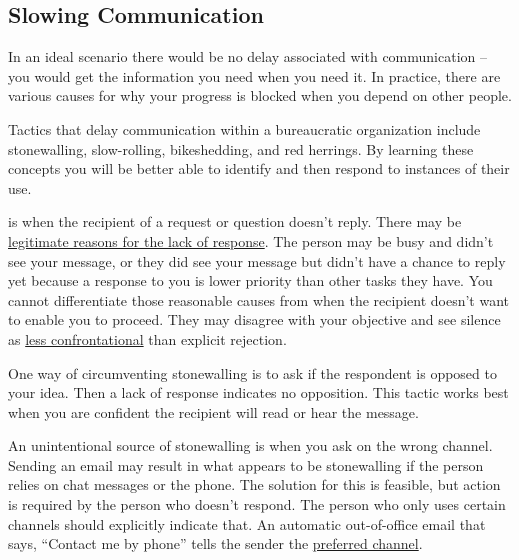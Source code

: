 \subsection*{Slowing Communication\label{sec:slowing-communication}}

In an ideal scenario there would be no delay associated with communication -- you would get the information you need when you need it. In practice, there are various causes for why your progress is blocked when you depend on other people. 

Tactics that delay communication within a bureaucratic organization include stonewalling, slow-rolling, bikeshedding, and red herrings. By learning these concepts you will be better able to identify and then respond to instances of their use.

\iftoggle{glossaryinmargin}{\marginpar{[Glossary]}}{}
\iftoggle{glossarysubstitutionworks}{\Gls{stonewalling}}{Stonewalling} 
is when the recipient of a request or question  doesn't reply. There may be \hyperref[sec:email-responsiveness]{legitimate reasons for the lack of response}.
\iftoggle{haspagenumbers}{\marginpar{Page~\pageref{sec:email-responsiveness}.}}{}%
The person may be busy and didn't see your message, or they did see your message but didn't have a chance to reply yet because a response to you is lower priority than other tasks they have. You cannot differentiate those reasonable causes from when the recipient doesn't want to enable you to proceed. They may disagree with your objective and see silence as \href{https://en.wikipedia.org/wiki/Passive-aggressive_behavior}{less confrontational}
\iftoggle{WPinmargin}{\marginpar{$>$Wikipedia: Passive-aggressive behavior}}{}
than explicit rejection. 

One way of circumventing stonewalling is to ask if the respondent is opposed to your idea. 
%
%
Then a lack of response indicates no opposition. This tactic works best when you are confident the recipient will read or hear the message.

An unintentional source of stonewalling is when you ask on the wrong channel. Sending an email may result in what appears to be stonewalling if the person relies on chat messages or the phone. The solution for this
%
%
is feasible, but action is required by the person who doesn't respond. The person who only uses certain channels should explicitly indicate that. An automatic out-of-office email that says, ``Contact me by phone'' tells the sender the \hyperref[sec:communication-preferences]{preferred channel}. 

